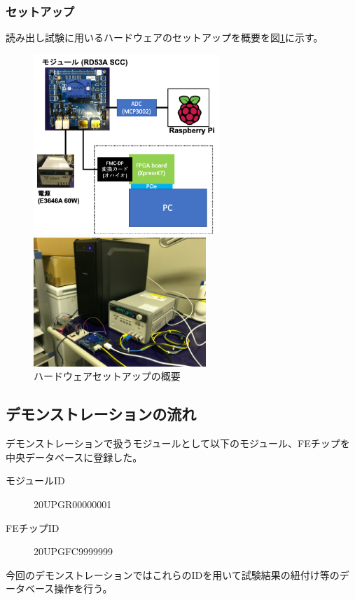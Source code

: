 \subsubsection{セットアップ}
読み出し試験に用いるハードウェアのセットアップを概要を図\ref{readout_setup_overview}に示す。

\begin{figure}[bpt]\centering
  \begin{minipage}{0.5\hsize}
    \includegraphics[width=7cm]{HW_setup}
  \end{minipage}
  \begin{minipage}{0.4\hsize}
    \includegraphics[width=6.5cm]{HW_setup_pic}
  \end{minipage}
\caption[ハードウェアセットアップの概要]{ハードウェアセットアップの概要}
\label{readout_setup_overview}
\end{figure}


\clearpage
\subsection{デモンストレーションの流れ}
デモンストレーションで扱うモジュールとして以下のモジュール、FEチップを中央データベースに登録した。
\begin{description}
  \item[モジュールID] 20UPGR00000001
  \item[FEチップID] 20UPGFC9999999
\end{description}
今回のデモンストレーションではこれらのIDを用いて試験結果の紐付け等のデータベース操作を行う。

